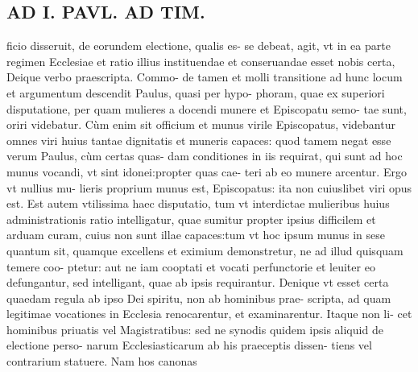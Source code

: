 \documentclass{article}
\begin{document}
\begin{pages}
\section*{AD I. PAVL. AD TIM. }
\marginpar{[ p.92 ]}\pstart ficio disseruit, de eorundem electione, qualis es- se debeat, agit, vt in ea parte regimen Ecclesiae et ratio illius instituendae et conseruandae esset nobis certa, Deique verbo praescripta. Commo- de tamen et molli transitione ad hunc locum et argumentum descendit Paulus, quasi per hypo- phoram, quae ex superiori disputatione, per quam mulieres a docendi munere et Episcopatu semo- tae sunt, oriri videbatur. Cùm enim sit officium et munus virile Episcopatus, videbantur omnes viri huius tantae dignitatis et muneris capaces: quod tamem negat esse verum Paulus, cùm certas quas- dam conditiones in iis requirat, qui sunt ad hoc munus vocandi, vt sint idonei:propter quas cae- teri ab eo munere arcentur. Ergo vt nullius mu- lieris proprium munus est, Episcopatus: ita non cuiuslibet viri opus est. Est autem vtilissima haec disputatio, tum vt interdictae mulieribus huius administrationis ratio intelligatur, quae sumitur propter ipsius difficilem et arduam curam, cuius non sunt illae capaces:tum vt hoc ipsum munus in sese quantum sit, quamque excellens et eximium demonstretur, ne ad illud quisquam temere coo- ptetur: aut ne iam cooptati et vocati perfunctorie et leuiter eo defungantur, sed intelligant, quae ab ipsis requirantur. Denique vt esset certa quaedam regula ab ipso Dei spiritu, non ab hominibus prae- scripta, ad quam legitimae vocationes in Ecclesia renocarentur, et examinarentur. Itaque non li- cet hominibus priuatis vel Magistratibus: sed ne synodis quidem ipsis aliquid de electione perso- narum Ecclesiasticarum ab his praeceptis dissen- tiens vel contrarium statuere. Nam hos canonas  \pend

\end{pages}
\end{document}
